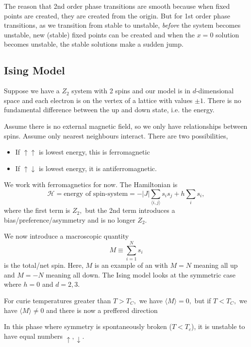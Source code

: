 \documentclass{article}
\numberwithin{equation}{section}
\begin{document}
\begin{itemize}
    The reason that 2nd order phase transitions are smooth because when fixed points are created, they are created from the origin. But for 1st order phase transitions, as we transition from stable to unstable, \textit{before} the system becomes unstable, new (stable) fixed points can be created and when the $x=0$ solution becomes unstable, the stable solutions make a sudden jump.
\end{itemize}
\subsection{Ising Model}
Suppose we have a $Z_2$ system with 2 spins and our model is in $d$-dimensional space and each electron is on the vertex of a lattice with values $\pm 1.$ There is no fundamental difference between the up and down state, i.e. the energy.

Assume there is no external magnetic field, so we only have relationships between spins. Assume only nearest neighbours interact. There are two possibilities,
\begin{itemize}
    \item If $\uparrow\uparrow$ is lowest energy, this is ferromagnetic
    \item If $\uparrow\downarrow$ is lowest energy, it is antiferromagnetic.
\end{itemize}
We work with ferromagnetics for now. The Hamiltonian is
\begin{equation*}
    \mathcal{H} = \text{energy of spin-system} = -|J| \sum_{\langle i,j\rangle} s_i s_j + h\sum_i s_i,
\end{equation*}
where the first term is $Z_2,$ but the 2nd term introduces a bias/preference/asymmetry and is no longer $Z_2.$

We now introduce a macroscopic quantity
\begin{equation*}
    M \equiv \sum_{i=1}^N s_i
\end{equation*}
is the total/net spin. Here, $M$ is an example of an  with $M=N$ meaning all up and $M=-N$ meaning all down. The Ising model looks at the symmetric case where $h=0$ and $d=2,3.$

For curie temperatures greater than $T>T_C,$ we have $\langle M \rangle = 0,$ but if $T<T_C,$ we have $\langle M \rangle \neq 0$ and there is now a preffered direction 

In this phase where symmetry is spontaneously broken ($T<T_c$), it is unstable to have equal numbers $\uparrow,\downarrow.$
\end{document}
